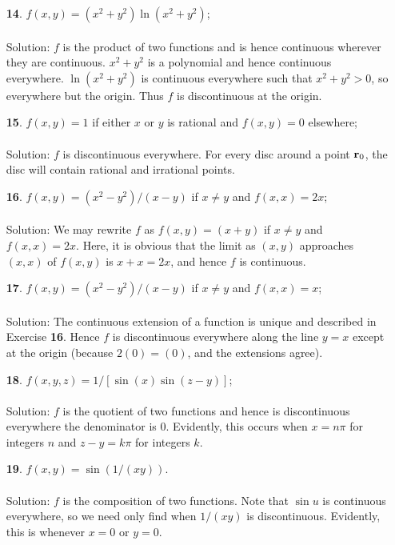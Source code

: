 \documentclass[12pt]{amsbook}
\begin{document}
\begin{enumerate}
  \\
  \item[{\small\bf 14}.] $f(x,y)=(x^2+y^2)\ln(x^2+y^2)$;
  \\
  \\
  {\sc Solution}: $f$ is the product of two functions and is hence continuous wherever they are continuous. $x^2+y^2$ is a polynomial and hence continuous everywhere. $\ln(x^2+y^2)$ is continuous everywhere such that $x^2+y^2 >0$, so everywhere but the origin. Thus $f$ is discontinuous at the origin.
  \\
  \item[{\small\bf 15}.] $f(x,y)=1$ if either $x$ or $y$ is rational and $f(x, y) = 0$ elsewhere;
  \\
  \\
  {\sc Solution}: $f$ is discontinuous everywhere. For every disc around a point ${\bf r}_0$, the disc will contain rational and irrational points.
  \\
  \item[{\small\bf 16}.] $f(x,y)=(x^2-y^2)/(x-y)$ if $x \neq y$ and $f(x,x)=2x$;
  \\
  \\
  {\sc Solution}: We may rewrite $f$ as $f(x,y)=(x+y)$ if $x \neq y$ and $f(x,x)=2x$. Here, it is obvious that the limit as $(x,y)$ approaches $(x,x)$ of $f(x,y)$ is $x+x=2x$, and hence $f$ is continuous.
  \\
  \item[{\small\bf 17}.] $f(x,y)=(x^2-y^2)/(x-y)$ if $x \neq y$ and $f(x,x)=x$;
  \\
  \\
  {\sc Solution}: The continuous extension of a function is unique and described in Exercise {\bf 16}. Hence $f$ is discontinuous everywhere along the line $y=x$ except at the origin (because $2(0)=(0)$, and the extensions agree).
  \\
  \item[{\small\bf 18}.] $f(x,y,z)=1/[\sin(x)\sin(z-y)]$;
  \\
  \\
  {\sc Solution}: $f$ is the quotient of two functions and hence is discontinuous everywhere the denominator is $0$. Evidently, this occurs when $x=n\pi$ for integers $n$ and $z-y=k\pi$ for integers $k$.
  \\
  \item[{\small\bf 19}.] $f(x,y)=\sin(1/(xy))$.
  \\
  \\
  {\sc Solution}: $f$ is the composition of two functions. Note that $\sin u$ is continuous everywhere, so we need only find when $1/(xy)$ is discontinuous. Evidently, this is whenever $x=0$ or $y=0$.
  \\
\end{enumerate}
\end{document}

